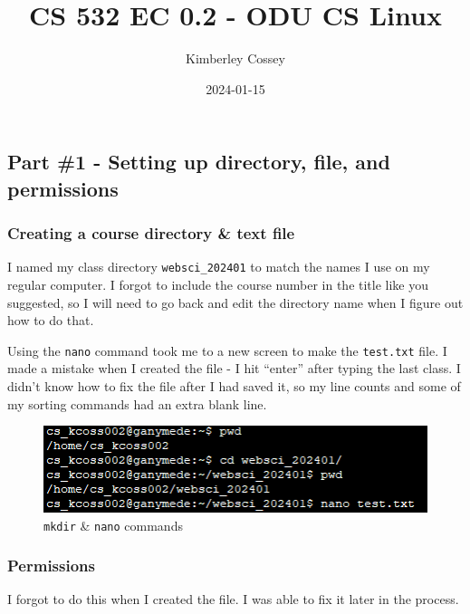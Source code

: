 \documentclass[
]{article}
\title{CS 532 EC 0.2 - ODU CS Linux}
\author{Kimberley Cossey}
\date{2024-01-15}
\begin{document}
\maketitle

\hypertarget{part-1---setting-up-directory-file-and-permissions}{%
\subsection{\texorpdfstring{\textbf{Part \#1 - Setting up directory,
file, and
permissions}}{Part \#1 - Setting up directory, file, and permissions}}\label{part-1---setting-up-directory-file-and-permissions}}

\hypertarget{creating-a-course-directory-text-file}{%
\subsubsection{Creating a course directory \& text
file}\label{creating-a-course-directory-text-file}}

I named my class directory \texttt{websci\_202401} to match the names I
use on my regular computer. I forgot to include the course number in the
title like you suggested, so I will need to go back and edit the
directory name when I figure out how to do that.

Using the \texttt{nano} command took me to a new screen to make the
\texttt{test.txt} file. I made a mistake when I created the file - I hit
``enter'' after typing the last class. I didn't know how to fix the file
after I had saved it, so my line counts and some of my sorting commands
had an extra blank line.

\begin{figure}
\centering
\includegraphics{linux_cmd_mkdir.png}
\caption{\texttt{mkdir} \& \texttt{nano} commands}
\end{figure}

\hypertarget{permissions}{%
\subsubsection{Permissions}\label{permissions}}

I forgot to do this when I created the file. I was able to fix it later
in the process.
\end{document}
